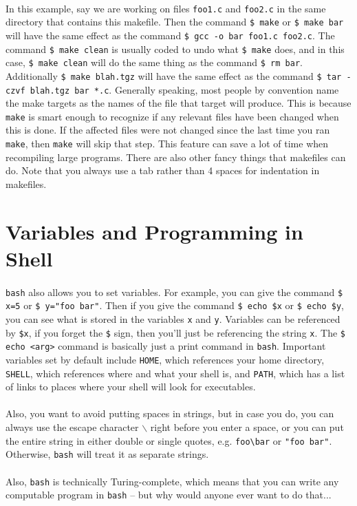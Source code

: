 \documentclass{article}
\begin{document}
\paragraph{} In this example, say we are working on files \texttt{foo1.c} and \texttt{foo2.c} in the same directory that contains this makefile. Then the command \texttt{\$ make} or \texttt{\$ make bar} will have the same effect as the command \texttt{\$ gcc -o bar foo1.c foo2.c}. The command \texttt{\$ make clean} is usually coded to undo what \texttt{\$ make} does, and in this case, \texttt{\$ make clean} will do the same thing as the command \texttt{\$ rm bar}. Additionally \texttt{\$ make blah.tgz} will have the same effect as the command \texttt{\$ tar -czvf blah.tgz bar *.c}. Generally speaking, most people by convention name the make targets as the names of the file that target will produce. This is because \texttt{make} is smart enough to recognize if any relevant files have been changed when this is done. If the affected files were not changed since the last time you ran \texttt{make}, then \texttt{make} will skip that step. This feature can save a lot of time when recompiling large programs. There are also other fancy things that makefiles can do. Note that you always use a tab rather than 4 spaces for indentation in makefiles.

\section{Variables and Programming in Shell}

\paragraph{} \texttt{bash} also allows you to set variables. For example, you can give the command \texttt{\$ x=5} or \texttt{\$ y="foo bar"}. Then if you give the command \texttt{\$ echo \$x} or \texttt{\$ echo \$y}, you can see what is stored in the variables \texttt{x} and \texttt{y}. Variables can be referenced by \texttt{\$x}, if you forget the \texttt{\$} sign, then you'll just be referencing the string \texttt{x}. The \texttt{\$ echo <arg>} command is basically just a print command in \texttt{bash}. Important variables set by default include \texttt{HOME}, which references your home directory, \texttt{SHELL}, which references where and what your shell is, and \texttt{PATH}, which has a list of links to places where your shell will look for executables.

\paragraph{} Also, you want to avoid putting spaces in strings, but in case you do, you can always use the escape character $\backslash$ right before you enter a space, or you can put the entire string in either double or single quotes, e.g. \texttt{foo\textbackslash\space bar} or \texttt{"foo bar"}. Otherwise, \texttt{bash} will treat it as separate strings.

\paragraph{} Also, \texttt{bash} is technically Turing-complete, which means that you can write any computable program in \texttt{bash} -- but why would anyone ever want to do that...
\end{document}
